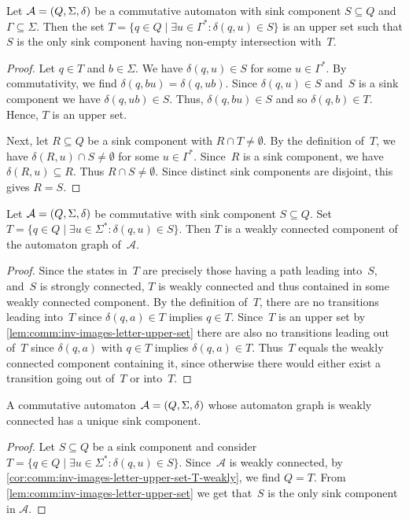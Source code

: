 \begin{lemma} \label{lem:comm:inv-images-letter-upper-set}
	Let $\mathcal A = (Q, \Sigma, \delta)$ be a commutative automaton
	with sink component $S \subseteq Q$ and $\Gamma \subseteq \Sigma$.
	Then the set $T = \{ q \in Q \mid \exists u \in \Gamma^* \colon \delta(q, u) \in S \}$
	is an upper set
	such that $S$ is the only sink component having non-empty intersection with~$T$.
\end{lemma}
\begin{proof}
	Let $q \in T$ and $b \in \Sigma$.
	We have $\delta(q, u) \in S$ for some $u \in \Gamma^*$.
	By commutativity, we find $\delta(q, b u) = \delta(q, u b)$.
	Since $\delta(q, u) \in S$ and~$S$ is a sink component
	we have $\delta(q, ub) \in S$.	
	Thus, $\delta(q, b u) \in S$ and so $\delta(q, b) \in T$. Hence, $T$ is an upper set.
	
	Next, let $R \subseteq Q$ be a sink component with $R \cap T \ne \emptyset$.
	By the definition of~$T$, 
	we have $\delta(R, u) \cap S \ne \emptyset$ for some $u \in \Gamma^*$.
	Since~$R$ is a sink component, we have $\delta(R, u) \subseteq R$.
	Thus $R \cap S \ne \emptyset$.
	Since distinct sink components are disjoint, this gives $R = S$.	
\end{proof}

\begin{corollary} \label{cor:comm:inv-images-letter-upper-set-T-weakly}
	Let $\mathcal A = (Q, \Sigma, \delta)$ be commutative
	with sink component $S \subseteq Q$.
	Set $T = \{  q \in Q \mid \exists u \in \Sigma^* \colon \delta(q, u) \in S \}$.
	Then $T$ is a weakly connected component of the automaton graph of~$\mathcal A$.
\end{corollary}
\begin{proof}
	Since the states in~$T$ are precisely those having a path leading into~$S$,
	and~$S$ is strongly connected, $T$ is weakly connected
	and thus contained in some weakly connected component.
	By the definition of~$T$, there are no transitions leading into~$T$
	since $\delta(q, a) \in T$ implies $q \in T$.
	Since~$T$ is an upper set by \cref{lem:comm:inv-images-letter-upper-set}
	there are also no transitions leading out of~$T$ since $\delta(q, a)$
	with $q \in T$ implies $\delta(q, a) \in T$.
	Thus~$T$ equals the weakly connected component
	containing it, since otherwise there would either exist a transition
	going out of~$T$ or into~$T$.
\end{proof}

\begin{corollary}  \label{cor:comm:inv-images-letter-upper-set}
	A commutative automaton $\mathcal A = (Q, \Sigma, \delta)$ whose automaton graph is weakly connected
	has a unique sink component.
\end{corollary}
\begin{proof}
	Let $S \subseteq Q$ be a sink component
	and consider $T = \{  q \in Q \mid \exists u \in \Sigma^* \colon \delta(q, u) \in S \}$.
	Since~$\mathcal A$ is weakly connected, by \cref{cor:comm:inv-images-letter-upper-set-T-weakly},
	we find $Q = T$.
	From \cref{lem:comm:inv-images-letter-upper-set} 
	we get that~$S$ is the only sink component in $\mathcal A$.
\end{proof}

